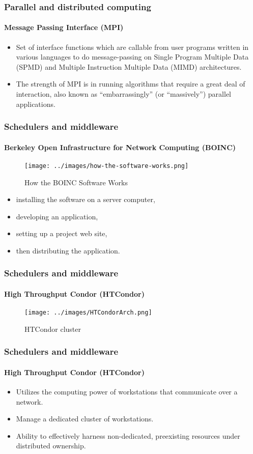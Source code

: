 \documentclass[11pt]{beamer}
\begin{document}
\begin{frame}
\frametitle{Parallel and distributed computing}
\framesubtitle{Message Passing Interface (MPI)}
\begin{itemize}
	\item Set of interface functions which are callable from user programs written in various languages to do message-passing on Single Program Multiple Data (SPMD) and Multiple Instruction Multiple Data (MIMD) architectures.
	\item The strength of MPI is in running algorithms that require a great deal of interaction, also known as “embarrassingly” (or “massively”) parallel applications.
\end{itemize}
\end{frame}

\begin{frame}
\frametitle{Schedulers and middleware}
\framesubtitle{Berkeley Open Infrastructure for Network Computing (BOINC)}
\begin{figure}[h]
	\centering
	\texttt{[image: ../images/how-the-software-works.png]}
	\caption{How the BOINC Software Works}
	\label{software}
\end{figure}
\begin{itemize}
	\item installing the software on a server computer,
	\item developing an application,
	\item setting up a project web site,
	\item then distributing the application.
\end{itemize}
\end{frame}

\begin{frame}
\frametitle{Schedulers and middleware}
\framesubtitle{High Throughput Condor (HTCondor)}
\begin{figure}[h]
	\centering
	\texttt{[image: ../images/HTCondorArch.png]}
	\caption{HTCondor cluster}
	\label{htcondor_cluster}
\end{figure}
\end{frame}

\begin{frame}
\frametitle{Schedulers and middleware}
\framesubtitle{High Throughput Condor (HTCondor)}
\begin{itemize}
	\item Utilizes the computing power of workstations that communicate over a network.
	\item Manage a dedicated cluster of workstations.
	\item Ability to effectively harness non-dedicated, preexisting resources under distributed ownership.
\end{itemize}
\end{frame}
\end{document}
